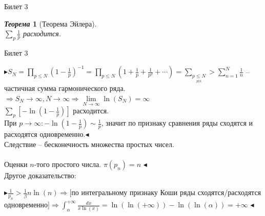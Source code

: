 \documentclass[a4paper,12pt]{article}
\newtheorem{teo}{\textit{Теорема}}
\newcommand{\q}{\quad}
\newcommand{\pb}{\blacktriangleright}
\newcommand{\pe}{\blacktriangleleft}
\newcommand{\Ra}{\Rightarrow}
\newcommand{\SL}{\sum\limits}
\newcommand{\os}{\left(}
\newcommand{\cs}{\right)}
\begin{document}
\begin{mybox}{\hypertarget{bil3}{Билет 3}}
\begin{formbox}{}
\begin{teo}[Теорема Эйлера]\q\\$\sum_p \frac{1}{p}$ расходится.
\end{teo}
\end{formbox}
\end{mybox}
\newpage
\begin{mybox}{{Билет 3}}

$\pb S_N = \prod\limits_{p \le N} (1 - \frac{1}{p})^{-1} = \prod\limits_{p \le N} \os 1 + \frac{1}{p} + \frac{1}{p^2} + \cdots\cs = \SL_{\underset{ p|n}{p \le N}} > \SL_{n=1}^N\frac{1}{n}$ -- частичная сумма гармонического ряда.\\
$\Ra S_N\to \infty, N\to\infty\Ra \lim\limits_{N\to\infty}\ln(S_N) = \infty$\\
$\SL_p[-\ln(1-\frac{1}{p})]$ расходится.\\
При $p\to\infty: -\ln(1-\frac{1}{p}) \sim \frac{1}{p}$, значит по признаку сравнения ряды сходятся и расходятся одновременно.$\pe$\\
Следствие -- бесконечность множества простых чисел.\\\q\\
Оценки $n$-того простого числа. $\pi(p_n) = n$ $\pe$ \\
Другое доказательство:

$ \pb \frac{1}{p_n} > \frac{1}{\beta}n \ln (n) \Ra [$по интегральному признаку Коши ряды сходятся/расходятся одновременно$] \Ra \int_{\alpha}^{+\infty}\frac{dx}{x \ln(x)} = \ln(\ln(+\infty)) - \ln(\ln(\alpha)) = +\infty $ $\pe$

\end{mybox}
\end{document}
